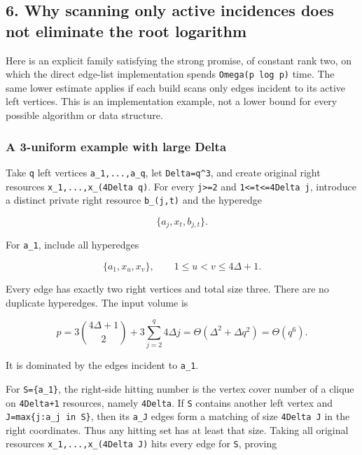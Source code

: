 \hypertarget{af-6a8212874a-why-scanning-only-active-incidences-does-not-eliminate-the-root-logarithm}{%
\subsection{6. Why scanning only active incidences does not eliminate the root logarithm}\label{af-6a8212874a-why-scanning-only-active-incidences-does-not-eliminate-the-root-logarithm}}

Here is an explicit family satisfying the strong promise, of constant rank two, on which the direct edge-list implementation spends \texttt{Omega(p\ log\ p)} time. The same lower estimate applies if each build scans only edges incident to its active left vertices. This is an implementation example, not a lower bound for every possible algorithm or data structure.

\hypertarget{af-6a8212874a-a-3-uniform-example-with-large-delta}{%
\subsubsection{A 3-uniform example with large Delta}\label{af-6a8212874a-a-3-uniform-example-with-large-delta}}

Take \texttt{q} left vertices \texttt{a\_1,...,a\_q}, let \texttt{Delta=q\^{}3}, and create original right resources \texttt{x\_1,...,x\_(4Delta\ q)}. For every \texttt{j\textgreater{}=2} and \texttt{1\textless{}=t\textless{}=4Delta\ j}, introduce a distinct private right resource \texttt{b\_(j,t)} and the hyperedge

\[
\{a_j,x_t,b_{j,t}\}.
\]

For \texttt{a\_1}, include all hyperedges

\[
\{a_1,x_u,x_v\},
             \qquad1\le u<v\le4\Delta+1.
\]

Every edge has exactly two right vertices and total size three. There are no duplicate hyperedges. The input volume is

\[
p=3\binom{4\Delta+1}{2}
       +3\sum_{j=2}^q4\Delta j
       =\Theta(\Delta^2+\Delta q^2)=\Theta(q^6).
 \tag{15}
\]

It is dominated by the edges incident to \texttt{a\_1}.

For \texttt{S=\{a\_1\}}, the right-side hitting number is the vertex cover number of a clique on \texttt{4Delta+1} resources, namely \texttt{4Delta}. If \texttt{S} contains another left vertex and \texttt{J=max\{j:a\_j\ in\ S\}}, then its \texttt{a\_J} edges form a matching of size \texttt{4Delta\ J} in the right coordinates. Thus any hitting set has at least that size. Taking all original resources \texttt{x\_1,...,x\_(4Delta\ J)} hits every edge for \texttt{S}, proving

